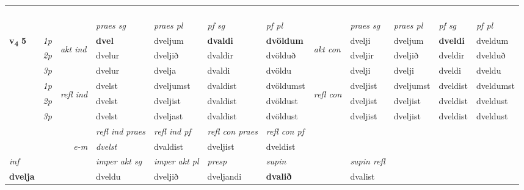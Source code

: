 \begin{longtable}[l]{X>{\footnotesize\itshape}llXXXXlXXXX}
\midrule
  & \\*
   & \\*
   & \\*
  & \\
   \midrule
 & &   & \textit{praes sg}  & \textit{praes pl}    & \textit{ pf sg} & \textit{pf pl} & & \textit{praes sg}  & \textit{praes pl}    & \textit{pf sg} & \textit{pf pl }  \\ \cmidrule{4-7} \cmidrule{9-12}
 \multirow{2}{*}{{{\textbf{v{\textsubscript{4}}} \Large{\textbf{5}}}}}  & 1p & \multirow{3}{*}{\begin{turn}{90}\textit{akt ind}\end{turn}} & \textbf{dvel} & dveljum & \textbf{dvaldi} & \textbf{dvöldum} & \multirow{3}{*}{\begin{turn}{90}\textit{akt con}\end{turn}} &dvelji & dveljum & \textbf{dveldi} & dveldum\\*
 & 2p &  &  dvelur  & dveljið & dvaldir & dvölduð & & dveljir & dveljið & dveldir & dvelduð \\*
 & 3p &  & dvelur & dvelja & dvaldi & dvöldu & & dvelji & dvelji& dveldi & dveldu \\*
\cmidrule{4-7} \cmidrule{9-12}
 & 1p & \multirow{3}{*}{\begin{turn}{90}\textit{refl ind}\end{turn}}  & dvelst & dveljumst & dvaldist & dvöldumst & \multirow{3}{*}{\begin{turn}{90}\textit{refl con}\end{turn}}  &dveljist & dveljumst & dveldist & dveldumst \\*
 & 2p &  & dvelst & dveljist & dvaldist & dvöldust & &dveljist & dveljist & dveldist & dveldust \\*
 & 3p  & & dvelst & dveljast & dvaldist & dvöldust & & dveljist & dveljist& dveldist & dveldust \\*
\cmidrule{4-7} \cmidrule{9-12}

 & && \textit{refl ind praes} & \textit{refl ind pf} & \textit{refl con praes} & \textit{refl con pf} \\*
\multicolumn{3}{r}{\textit{e-m}}& dvelst & dvaldist & dveljist & dveldist \\*

\cmidrule{4-7}
   {\textit{inf}} & &  & \textit{imper akt sg} & \textit{imper akt pl}   & \textit{presp} & \textit{supin} && \textit{supin refl}  \\*
  {\textbf{dvelja}} & && dveldu  & dveljið   & dveljandi &  \textbf{dvalið} && dvalist  \\*


\end{longtable}

